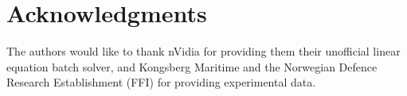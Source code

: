 \documentclass[10pt,a4paper]{article}
\newcommand\1{\vec 1}
\begin{document}


\section*{Acknowledgments}

The authors would like to thank nVidia for providing them their unofficial linear equation batch solver, and Kongsberg Maritime and the Norwegian Defence Research Establishment (FFI) for providing experimental data.


\newpage


\end{document}
